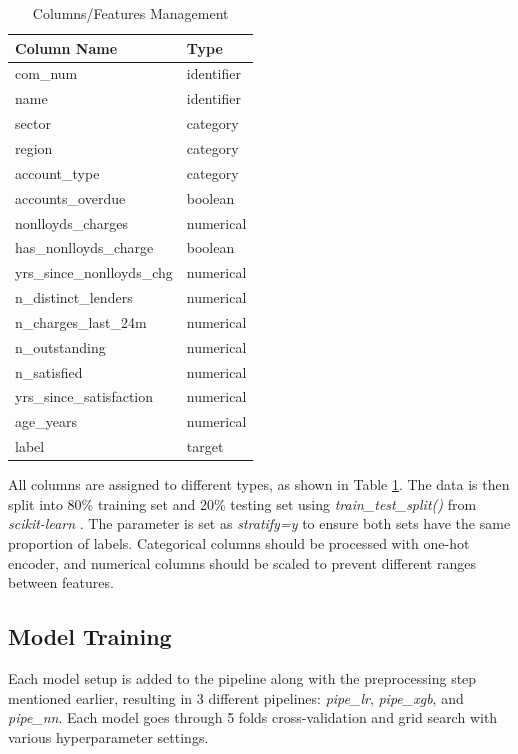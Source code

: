 \documentclass[ %
                    author={Natchalin Iwsakul \\ Inkaphol Siriwongwattana \\ Tanaphan Kummaraphat \\ Patorn Srisupap},
                supervisor={Fernando Moreno-Pino},
                    degree={MSc},
                     title={Propensity Modelling for SME Commercial Lending Using Open Public Data},
                  subtitle={Companies House filings and GDELT media coverage as predictors of first-time borrowing},
                      type={},
                      year={2026}]{dissertation}
\begin{document}
  \begin{table}[h]
      \centering
      \begin{tabular}{ll}
      \toprule
          Column Name & Type \\
      \midrule
          com\_num & identifier \\
          name & identifier \\
          sector & category \\
          region & category \\
          account\_type & category \\
          accounts\_overdue & boolean \\
          nonlloyds\_charges & numerical \\
          has\_nonlloyds\_charge & boolean \\
          yrs\_since\_nonlloyds\_chg & numerical \\
          n\_distinct\_lenders & numerical \\
          n\_charges\_last\_24m & numerical \\
          n\_outstanding & numerical \\
          n\_satisfied & numerical \\
          yrs\_since\_satisfaction & numerical \\
          age\_years & numerical \\
          label & target \\
      \bottomrule
      \end{tabular}
      \caption{Columns/Features Management}
      \label{columnsmanagement}
  \end{table}
  
  All columns are assigned to different types, as shown in Table \ref{columnsmanagement}. The data is then split into 80\% training set and 20\% testing set using \textit{train\_test\_split()} from \textit{scikit-learn} \cite{Pedregosa_Scikit-learn_Machine_Learning_2011}. The parameter is set as \textit{stratify=y} to ensure both sets have the same proportion of labels. Categorical columns should be processed with one-hot encoder, and numerical columns should be scaled to prevent different ranges between features. 
    
  \subsection{Model Training}
  Each model setup is added to the pipeline along with the preprocessing step mentioned earlier, resulting in 3 different pipelines: \textit{pipe\_lr}, \textit{pipe\_xgb}, and \textit{pipe\_nn}. Each model goes through 5 folds cross-validation and grid search with various hyperparameter settings.
\end{document}
